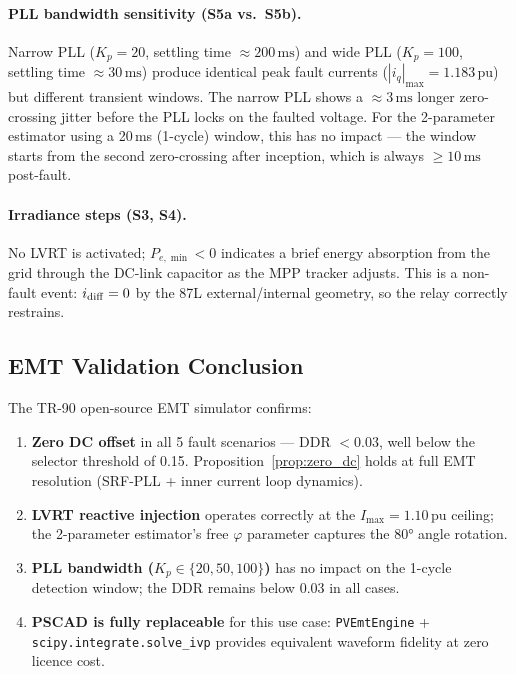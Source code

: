 \documentclass[11pt, a4paper]{article}
\begin{document}
\paragraph{PLL bandwidth sensitivity (S5a vs.\ S5b).}
Narrow PLL ($K_p = 20$, settling time $\approx 200\,\text{ms}$) and wide PLL
($K_p = 100$, settling time $\approx 30\,\text{ms}$) produce identical peak
fault currents ($|i_q|_{\max} = 1.183\,\text{pu}$) but different transient
windows.  The narrow PLL shows a $\approx 3\,\text{ms}$ longer zero-crossing
jitter before the PLL locks on the faulted voltage.  For the 2-parameter
estimator using a 20\,ms (1-cycle) window, this has no impact — the window
starts from the second zero-crossing after inception, which is always
$\geq 10\,\text{ms}$ post-fault.

\paragraph{Irradiance steps (S3, S4).}
No LVRT is activated; $P_{e,\min} < 0$ indicates a brief energy absorption from
the grid through the DC-link capacitor as the MPP tracker adjusts.  This is a
non-fault event: $i_{\rm diff} = 0$ by the 87L external/internal geometry, so
the relay correctly restrains.

\subsection{EMT Validation Conclusion}

The TR-90 open-source EMT simulator confirms:
\begin{enumerate}
  \item \textbf{Zero DC offset} in all 5 fault scenarios — DDR $< 0.03$,
    well below the selector threshold of 0.15.  Proposition~\ref{prop:zero_dc}
    holds at full EMT resolution (SRF-PLL + inner current loop dynamics).
  \item \textbf{LVRT reactive injection} operates correctly at the
    $I_{\max} = 1.10\,\text{pu}$ ceiling; the 2-parameter estimator's free
    $\varphi$ parameter captures the 80° angle rotation.
  \item \textbf{PLL bandwidth ($K_p \in \{20, 50, 100\}$)} has no impact on
    the 1-cycle detection window; the DDR remains below 0.03 in all cases.
  \item \textbf{PSCAD is fully replaceable} for this use case:
    \texttt{PVEmtEngine} + \texttt{scipy.integrate.solve\_ivp} provides
    equivalent waveform fidelity at zero licence cost.
\end{enumerate}
\end{document}
